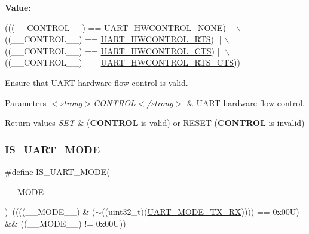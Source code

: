 {\bfseries Value\+:}
\begin{DoxyCode}
(((\_\_CONTROL\_\_) == \hyperlink{group___u_a_r_t___hardware___flow___control_gae0569001c06b7760cd38c481f84116cf}{UART\_HWCONTROL\_NONE}) || \(\backslash\)
                                    ((\_\_CONTROL\_\_) == \hyperlink{group___u_a_r_t___hardware___flow___control_ga6d5dad09c6abf30f252084ba0f8c0b7d}{UART\_HWCONTROL\_RTS})  || \(\backslash\)
                                    ((\_\_CONTROL\_\_) == \hyperlink{group___u_a_r_t___hardware___flow___control_ga352f517245986e3b86bc75f8472c51ea}{UART\_HWCONTROL\_CTS})  || \(\backslash\)
                                    ((\_\_CONTROL\_\_) == \hyperlink{group___u_a_r_t___hardware___flow___control_ga7c91698e8f08ba7ed3f2a0ba9aa27d73}{UART\_HWCONTROL\_RTS\_CTS}))
\end{DoxyCode}


Ensure that U\+A\+RT hardware flow control is valid. 


\begin{DoxyParams}{Parameters}
{\em $<$strong$>$\+C\+O\+N\+T\+R\+O\+L$<$/strong$>$} & U\+A\+RT hardware flow control. \\
\hline
\end{DoxyParams}

\begin{DoxyRetVals}{Return values}
{\em S\+ET} & ({\bfseries C\+O\+N\+T\+R\+OL} is valid) or R\+E\+S\+ET ({\bfseries C\+O\+N\+T\+R\+OL} is invalid) \\
\hline
\end{DoxyRetVals}
\mbox{\label{group___u_a_r_t___private___macros_gae5b637b9191dea1f8fd3846b886dd38b}} 
\subsubsection{\texorpdfstring{I\+S\+\_\+\+U\+A\+R\+T\+\_\+\+M\+O\+DE}{IS\_UART\_MODE}}
{\footnotesize\ttfamily \#define I\+S\+\_\+\+U\+A\+R\+T\+\_\+\+M\+O\+DE(\begin{DoxyParamCaption}\item[{}]{\+\_\+\+\_\+\+M\+O\+D\+E\+\_\+\+\_\+ }\end{DoxyParamCaption})~((((\+\_\+\+\_\+\+M\+O\+D\+E\+\_\+\+\_\+) \& ($\sim$((uint32\+\_\+t)(\hyperlink{group___u_a_r_t___mode_gab47c162935901e89322e2ce6700b6744}{U\+A\+R\+T\+\_\+\+M\+O\+D\+E\+\_\+\+T\+X\+\_\+\+RX})))) == 0x00\+U) \&\& ((\+\_\+\+\_\+\+M\+O\+D\+E\+\_\+\+\_\+) != 0x00\+U))}



